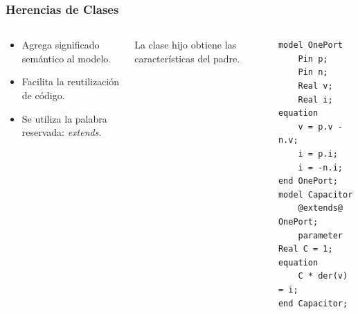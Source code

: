 %





\begin{frame}[fragile]
\frametitle{Herencias de Clases} 
\begin{columns}  
\column[t]{8cm}  

\begin{block}{}
\begin{itemize}
    \item Agrega significado semántico al modelo.
    \item Facilita la reutilización de código.
    \item Se utiliza la palabra reservada: \textit{extends}.
\end{itemize} 
\end{block}

\begin{block}{}
La clase hijo obtiene las características del padre.
\end{block}

\column[t]{5cm}  
\begin{lstlisting}[style=base]
model OnePort
    Pin p;
    Pin n;
    Real v;
    Real i;
equation
    v = p.v - n.v;
    i = p.i;
    i = -n.i;
end OnePort;
model Capacitor
    @extends@ OnePort;
    parameter Real C = 1;
equation
    C * der(v) = i;
end Capacitor;
\end{lstlisting}
\end{columns}
\end{frame}

